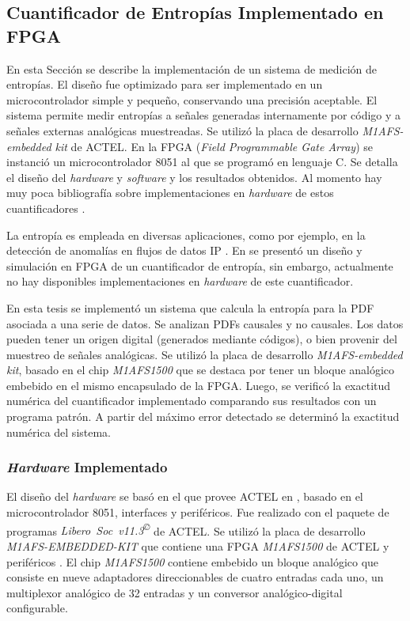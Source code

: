 \subsection{Cuantificador de Entropías Implementado en FPGA}
\label{ssecCuantiImpFPGA}

En esta Sección se describe la implementación de un sistema de medición de entropías.
El diseño fue optimizado para ser implementado en un microcontrolador simple y pequeño, conservando una precisión aceptable.
El sistema permite medir entropías a señales generadas internamente por código y a señales externas analógicas muestreadas.
Se utilizó la placa de desarrollo \textit{M1AFS-embedded kit} de ACTEL.
En la FPGA (\textit{Field Programmable Gate Array}) se instanció un microcontrolador 8051 al que se programó en lenguaje C.
Se detalla el diseño del \textit{hardware} y \textit{software} y los resultados obtenidos.
Al momento hay muy poca bibliograf\'ia sobre implementaciones en \textit{hardware} de estos cuantificadores \cite{DeMicco2013}.

La entropía es empleada en diversas aplicaciones, como por ejemplo, en la detección de anomalías en flujos de datos IP \cite{Gu2005,Wagner2006, actelM1AFS1500}.
En \cite{Subramanya2008} se presentó un diseño y simulación en FPGA de un cuantificador de entropía, sin embargo, actualmente no hay disponibles implementaciones en \textit{hardware} de este cuantificador.

En esta tesis se implementó un sistema que calcula la entropía para la PDF asociada a una serie de datos.
Se analizan PDFs causales y no causales.
Los datos pueden tener un origen digital (generados mediante códigos), o bien provenir del muestreo de señales analógicas.
Se utilizó la placa de desarrollo \textit{M1AFS-embedded kit}, basado en el chip \textit{M1AFS1500} que se destaca por tener un bloque analógico embebido en el mismo encapsulado de la FPGA.
Luego, se verificó la exactitud numérica del cuantificador implementado comparando sus resultados con un programa patrón.
A partir del máximo error detectado se determinó la exactitud numérica del sistema.

\subsubsection{\textit{Hardware} Implementado}
\label{sec:Hardware}

El diseño del \textit{hardware} se basó en el que provee ACTEL en \cite{Core8051sH}, basado en el microcontrolador 8051, interfaces y periféricos.
Fue realizado con el paquete de programas \textit{Libero~Soc~v11.3\textsuperscript\copyright} de ACTEL.
Se utilizó la placa de desarrollo \textit{M1AFS-EMBEDDED-KIT} que contiene una FPGA \textit{M1AFS1500} de ACTEL y periféricos \cite{actelM1AFS1500}.
El chip \textit{M1AFS1500} contiene embebido un bloque analógico que consiste en nueve adaptadores direccionables de cuatro entradas cada uno, un multiplexor analógico de 32 entradas y un conversor analógico-digital configurable.

